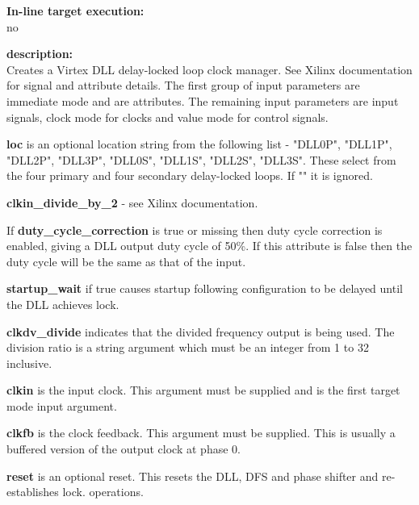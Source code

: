             {\bf In-line target execution:} \\
            no

            {\bf description:} \\
            Creates a Virtex DLL delay-locked loop clock manager. See Xilinx
            documentation for signal and attribute details. The first group of input
            parameters are immediate mode and are attributes. The remaining input
            parameters are input signals, clock mode for clocks and value mode for
            control signals.


                {\bf loc} is an optional location string from the
                following list - "DLL0P", "DLL1P", "DLL2P", "DLL3P", "DLL0S", "DLL1S",
                "DLL2S", "DLL3S". These select from the four primary and four secondary
                delay-locked loops. If "" it is ignored.

                {\bf clkin\_divide\_by\_2} - see Xilinx documentation.

                If {\bf duty\_cycle\_correction} is true or missing then duty cycle
                correction is enabled, giving a DLL output duty cycle of 50\%. If
                this attribute is false then the duty cycle will be the same as that
                of the input.

                {\bf startup\_wait} if true causes startup following configuration to
                be delayed until the DLL achieves lock.

                {\bf clkdv\_divide} indicates that the divided
                frequency output is being used. The division ratio is a
                string argument which must be an integer from 1 to 32 inclusive.


                {\bf clkin} is the input clock. This argument must be
                supplied and is the first target mode input argument.

                {\bf clkfb} is the clock feedback. This argument must be
                supplied. This is usually a buffered version of the output clock at
                phase 0.

                {\bf reset} is an optional reset. This resets the
                DLL, DFS and phase shifter and re-establishes lock.
                operations.


